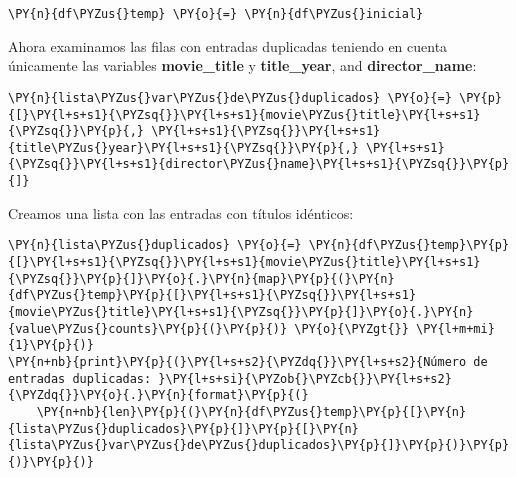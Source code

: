     \begin{tcolorbox}[breakable, size=fbox, boxrule=1pt, pad at break*=1mm,colback=cellbackground, colframe=cellborder]
\begin{Verbatim}[commandchars=\\\{\}]
\PY{n}{df\PYZus{}temp} \PY{o}{=} \PY{n}{df\PYZus{}inicial}
\end{Verbatim}
\end{tcolorbox}

    Ahora examinamos las filas con entradas duplicadas teniendo en cuenta
únicamente las variables \textbf{movie\_title} y \textbf{title\_year},
and \textbf{director\_name}:

    \begin{tcolorbox}[breakable, size=fbox, boxrule=1pt, pad at break*=1mm,colback=cellbackground, colframe=cellborder]
\begin{Verbatim}[commandchars=\\\{\}]
\PY{n}{lista\PYZus{}var\PYZus{}de\PYZus{}duplicados} \PY{o}{=} \PY{p}{[}\PY{l+s+s1}{\PYZsq{}}\PY{l+s+s1}{movie\PYZus{}title}\PY{l+s+s1}{\PYZsq{}}\PY{p}{,} \PY{l+s+s1}{\PYZsq{}}\PY{l+s+s1}{title\PYZus{}year}\PY{l+s+s1}{\PYZsq{}}\PY{p}{,} \PY{l+s+s1}{\PYZsq{}}\PY{l+s+s1}{director\PYZus{}name}\PY{l+s+s1}{\PYZsq{}}\PY{p}{]}
\end{Verbatim}
\end{tcolorbox}

    Creamos una lista con las entradas con títulos idénticos:

    \begin{tcolorbox}[breakable, size=fbox, boxrule=1pt, pad at break*=1mm,colback=cellbackground, colframe=cellborder]
\begin{Verbatim}[commandchars=\\\{\}]
\PY{n}{lista\PYZus{}duplicados} \PY{o}{=} \PY{n}{df\PYZus{}temp}\PY{p}{[}\PY{l+s+s1}{\PYZsq{}}\PY{l+s+s1}{movie\PYZus{}title}\PY{l+s+s1}{\PYZsq{}}\PY{p}{]}\PY{o}{.}\PY{n}{map}\PY{p}{(}\PY{n}{df\PYZus{}temp}\PY{p}{[}\PY{l+s+s1}{\PYZsq{}}\PY{l+s+s1}{movie\PYZus{}title}\PY{l+s+s1}{\PYZsq{}}\PY{p}{]}\PY{o}{.}\PY{n}{value\PYZus{}counts}\PY{p}{(}\PY{p}{)} \PY{o}{\PYZgt{}} \PY{l+m+mi}{1}\PY{p}{)}
\PY{n+nb}{print}\PY{p}{(}\PY{l+s+s2}{\PYZdq{}}\PY{l+s+s2}{Número de entradas duplicadas: }\PY{l+s+si}{\PYZob{}\PYZcb{}}\PY{l+s+s2}{\PYZdq{}}\PY{o}{.}\PY{n}{format}\PY{p}{(}
    \PY{n+nb}{len}\PY{p}{(}\PY{n}{df\PYZus{}temp}\PY{p}{[}\PY{n}{lista\PYZus{}duplicados}\PY{p}{]}\PY{p}{[}\PY{n}{lista\PYZus{}var\PYZus{}de\PYZus{}duplicados}\PY{p}{]}\PY{p}{)}\PY{p}{)}\PY{p}{)}
\end{Verbatim}
\end{tcolorbox}

